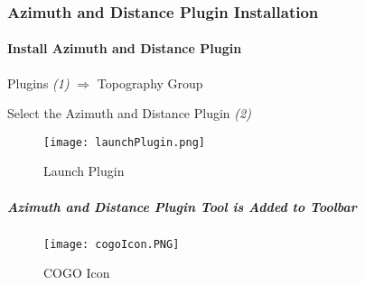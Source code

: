 \subsubsection{Azimuth and Distance Plugin Installation}

\paragraph*{Install Azimuth and Distance Plugin}

\noindent Plugins \emph{(1)} $\Rightarrow$ Topography Group
\vspace{.1in}

\noindent Select the Azimuth and Distance Plugin \emph{(2)}
\begin{figure}[H] %
\centering
    \texttt{[image: launchPlugin.png]}
\vspace{-.3in}

\caption{Launch Plugin}
\end{figure}
\vspace{.1in}

\subparagraph*{Azimuth and Distance Plugin Tool is Added to Toolbar}
\begin{figure}[H]
\centering
     \texttt{[image: cogoIcon.PNG]}

\caption{COGO Icon}
\end{figure}
\clearpage

